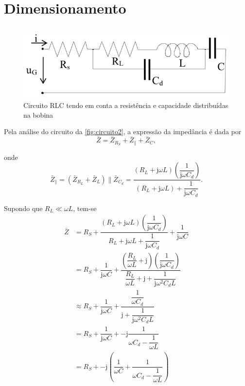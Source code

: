 \documentclass[a4paper, titlepage, portuguese]{article}
\begin{document}

	\section{Dimensionamento}
	\subsection{}
		\begin{figure}[h]
			\centering
			\includegraphics[width=0.6\linewidth]{circuito2.png}
			\caption{Circuito RLC tendo em conta a resistência e capacidade distribuídas na bobina}
			\label{fig:circuito2}
		\end{figure}
		\par
		Pela análise do circuito da \autoref{fig:circuito2}, a expressão da impedância é dada por
		\begin{equation}
			\bar{Z} = \bar{Z}_{R_S} + \bar{Z}_{\parallel} + \bar{Z}_C,
		\end{equation}
		\par
		onde
		\begin{equation}
			\bar{Z}_{\parallel} = (\bar{Z}_{R_L} + \bar{Z}_{L}) \parallel \bar{Z}_{C_d} = \dfrac{\left(R_L + \mathrm{j} \omega L\right)\left(\dfrac{1}{\mathrm{j} \omega C_d}\right)}{(R_L + \mathrm{j} \omega L) + \dfrac{1}{\mathrm{j} \omega C_d}}.
		\end{equation}
		\par
		Supondo que $R_L \ll \omega L$, tem-se
		\begin{align}
			\bar{Z} &= R_S + \dfrac{\left(R_L + \mathrm{j} \omega L\right)\left(\dfrac{1}{\mathrm{j} \omega C_d}\right)}{R_L + \mathrm{j} \omega L + \dfrac{1}{\mathrm{j} \omega C_d}} + \dfrac{1}{\mathrm{j} \omega C} \nonumber \\
			&= R_S + \dfrac{1}{\mathrm{j} \omega C} + \dfrac{\left(\dfrac{R_L}{\omega L} + \mathrm{j}\right)\left(\dfrac{1}{\mathrm{j} \omega C_d}\right)}{\dfrac{R_L}{\omega L} + \mathrm{j} + \dfrac{1}{\mathrm{j} \omega^2 C_d L}} \nonumber \\
			&\approx R_S + \dfrac{1}{\mathrm{j} \omega C} + \dfrac{\dfrac{1}{\omega C_d}}{\mathrm{j} + \dfrac{1}{\mathrm{j} \omega^2 C_d L}} \nonumber \\
			&= R_S + \dfrac{1}{\mathrm{j} \omega C} + -\mathrm{j}\dfrac{1}{\omega C_d - \dfrac{1}{\omega L}} \nonumber \\
			&= R_S + -\mathrm{j}\left(\dfrac{1}{\omega C} + \dfrac{1}{\omega C_d - \dfrac{1}{\omega L}}\right)
		\end{align}
\end{document}
